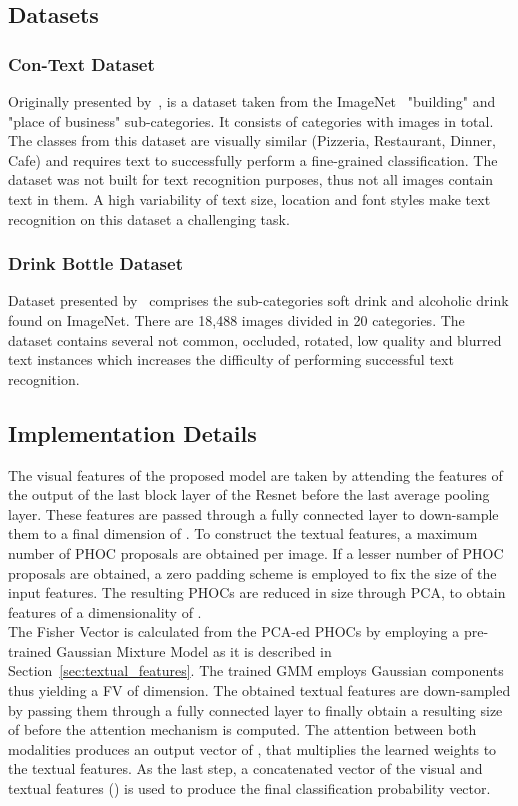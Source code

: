 \documentclass[10pt,twocolumn,letterpaper]{article}
\begin{document}
\subsection{Datasets}
\subsubsection{Con-Text Dataset} Originally presented by~\cite{karaoglu2013text}, is a dataset taken from the ImageNet~\cite{deng2009imagenet} "building" and "place of business" sub-categories. It consists of  categories with  images in total. The classes from this dataset are visually similar (Pizzeria, Restaurant, Dinner, Cafe) and requires text to successfully perform a fine-grained classification. The dataset was not built for text recognition purposes, thus not all images contain text in them. A high variability of text size, location and font styles make text recognition on this dataset a challenging task.
\subsubsection{Drink Bottle Dataset} Dataset presented by~\cite{bai2018integrating}
comprises the sub-categories soft drink and alcoholic drink found on ImageNet\cite{deng2009imagenet}. There are 18,488 images divided in 20 categories. The dataset contains several not common, occluded, rotated, low quality and blurred text instances which increases the difficulty of performing successful text recognition.

\subsection{Implementation Details}
The visual features of the proposed model are taken by attending the features of the output of the last block layer of the Resnet before the last average pooling layer. These features are passed through a fully connected layer to down-sample them to a final dimension of . To construct the textual features, a maximum number of  PHOC proposals are obtained per image. If a lesser number of PHOC proposals are obtained, a zero padding scheme is employed to fix the size of the input features. The resulting PHOCs are reduced in size through PCA, to obtain features of a dimensionality of . \\
The Fisher Vector is calculated from the PCA-ed PHOCs by employing a pre-trained Gaussian Mixture Model as it is described in Section~\ref{sec:textual_features}. The trained GMM employs  Gaussian components thus yielding a FV of  dimension. The obtained textual features are down-sampled by passing them through a fully connected layer to finally obtain a resulting size of  before the attention mechanism 
is computed. The attention between both modalities produces an output vector of , that multiplies the learned weights to the textual features. As the last step, a concatenated vector of the visual and textual features () is used to produce the final classification probability vector.
\end{document}
